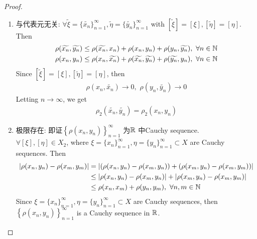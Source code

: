 \begin{thm}
\begin{proof}
\begin{enumerate}
				\vspace{1em}
				\begin{enumerate}
					\item 与代表元无关: $\forall \widetilde{\xi} = \{ \widetilde{x_n} \}_{n = 1}^{\infty}, \widetilde{\eta} = \{ \widetilde{y_n} \}_{n = 1}^{\infty}$ with $[\widetilde{\xi}] = [\xi] , [\widetilde{\eta}] = [\eta]$. Then
					\begin{align}
						\rho(\widetilde{x_n} , \widetilde{y_n}) 
						&\leq \rho(\widetilde{x_n} , x_n) + \rho(x_n , y_n) + \rho(y_n , \widetilde{y_n}) , \,\, \forall n \in \mathbb{N} \\
						\rho(x_n , y_n) 
						&\leq \rho(x_n , \widetilde{x_n}) + \rho(\widetilde{x_n} , \widetilde{y_n}) + \rho(\widetilde{y_n} , y_n) , \,\, \forall n \in \mathbb{N}
					\end{align}
					Since $[\widetilde{\xi}] = [\xi] , [\widetilde{\eta}] = [\eta]$, then
					\begin{align}
						\rho(x_n , \widetilde{x_n}) \to 0 , \,\, \rho(y_n , \widetilde{y_n}) \to 0
					\end{align}
					Letting $n \to \infty$, we get
					\begin{align}
						\rho_2(\widetilde{x_n} , \widetilde{y_n}) = \rho_2(x_n , y_n)
					\end{align}
					
					\vspace{2em}
					
					\item 极限存在: 即证$\left\{ \rho(x_n , y_n) \right\}_{n = 1}^{\infty}$ 为$\mathbb{R}$ 中Cauchy sequence. \\
					$\forall [\xi] , [\eta] \in X_2$, where $\xi = \{ x_n \}_{n = 1}^{\infty} , \eta = \{ y_n \}_{n = 1}^{\infty} \subset X$ are Cauchy sequences. Then
					\begin{align}
						\left| \rho(x_n , y_n) - \rho(x_m , y_m) \right| 
						&= \left| \left( \rho(x_n , y_n) - \rho(x_m , y_n) \right) + \left( \rho(x_m , y_n) - \rho(x_m , y_m) \right) \right| \\
						&\leq \left| \rho(x_n , y_n) - \rho(x_m , y_n) \right| + \left| \rho(x_m , y_n) - \rho(x_m , y_m) \right| \\
						&\leq \rho(x_n , x_m) + \rho(y_n , y_m) , \,\, \forall n , m \in \mathbb{N}
					\end{align}
					Since $\xi = \{ x_n \}_{n = 1}^{\infty} , \eta = \{ y_n \}_{n = 1}^{\infty} \subset X$ are Cauchy sequences, then $\left\{ \rho(x_n , y_n) \right\}_{n = 1}^{\infty}$ is a Cauchy sequence in $\mathbb{R}$.
				\end{enumerate}
				

\end{enumerate}
\end{proof}
\end{thm}
